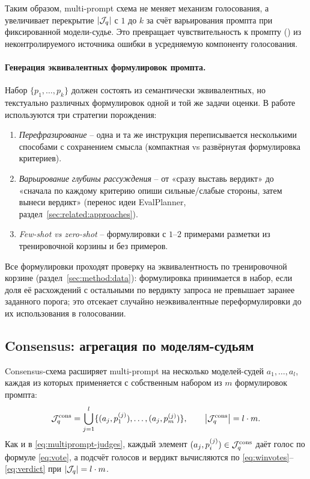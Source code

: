 Таким образом, multi-prompt схема не меняет механизм голосования, а
увеличивает перекрытие $\left\lvert\mathcal{J}_q\right\rvert$ с $1$ до $k$ за счёт
варьирования промпта при фиксированной модели-судье.
Это превращает чувствительность к промпту
(\cite{razavi2025benchmarking, arabzadeh2025humanai}) из
неконтролируемого источника ошибки в усредняемую компоненту голосования.

\paragraph{Генерация эквивалентных формулировок промпта.}
Набор $\{p_1, \dots, p_k\}$ должен состоять из семантически
эквивалентных, но текстуально различных формулировок одной и той же
задачи оценки. В работе используются три стратегии порождения:
\begin{enumerate}
    \item \emph{Перефразирование} -- одна и та же инструкция
        переписывается несколькими способами с сохранением смысла
        (компактная vs развёрнутая формулировка критериев).
    \item \emph{Варьирование глубины рассуждения} -- от «сразу выставь
        вердикт» до «сначала по каждому критерию опиши сильные/слабые
        стороны, затем вынеси вердикт» (перенос идеи EvalPlanner,
        раздел~\ref{sec:related:approaches}).
    \item \emph{Few-shot vs zero-shot} -- формулировки с $1$--$2$
        примерами разметки из тренировочной корзины и без примеров.
\end{enumerate}
Все формулировки проходят проверку на эквивалентность по тренировочной
корзине (раздел~\ref{sec:method:data}): формулировка принимается в
набор, если доля её расхождений с остальными по вердикту запроса не
превышает заранее заданного порога; это отсекает случайно неэквивалентные
переформулировки до их использования в голосовании.

\subsection{Consensus: агрегация по моделям-судьям}
\label{sec:method:hybrid:consensus}

Consensus-схема расширяет multi-prompt на несколько моделей-судей
$a_1, \dots, a_l$, каждая из которых применяется с собственным набором
из $m$ формулировок промпта:
\begin{equation}
    \label{eq:consensus-judges}
    \mathcal{J}_q^{\mathrm{cons}} =
        \bigcup_{j=1}^{l} \{ (a_j, p_1^{(j)}), \dots, (a_j, p_m^{(j)}) \},
    \qquad
    \left\lvert\mathcal{J}_q^{\mathrm{cons}}\right\rvert = l \cdot m.
\end{equation}
Как и в \eqref{eq:multiprompt-judges}, каждый элемент
$(a_j, p_i^{(j)}) \in \mathcal{J}_q^{\mathrm{cons}}$ даёт голос по формуле
\eqref{eq:vote}, а подсчёт голосов и вердикт вычисляются по
\eqref{eq:winvotes}--\eqref{eq:verdict} при $\left\lvert\mathcal{J}_q\right\rvert = l \cdot m$.


